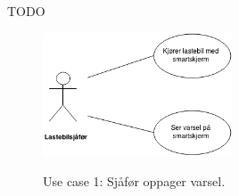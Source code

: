 TODO
	\newline
	\begin{figure}[H]
		\centering
		\includegraphics[width=0.50\textwidth]{images/UC1.png}
		\label{fig:UC1}
		\caption{Use case 1: Sjåfør oppager varsel.}
	\end{figure}